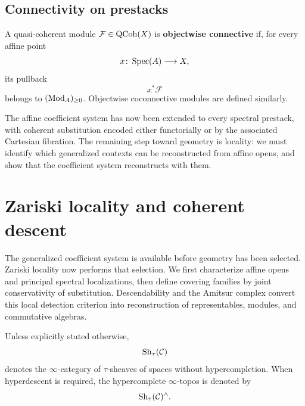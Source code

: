 \subsection{Connectivity on prestacks}

\begin{definition}
\label{def:objectwise-connective-qcoh}
A quasi-coherent module $\mathcal F\in\operatorname{QCoh}(X)$ is
\textbf{objectwise connective} if, for every affine point
\[
    x
    \colon
    \operatorname{Spec}(A)
    \longrightarrow
    X,
\]
its pullback
\[
    x^*\mathcal F
\]
belongs to $(\operatorname{Mod}_{A})_{\geq0}$. Objectwise coconnective modules are defined
similarly.
\end{definition}

The affine coefficient system has now been extended to every spectral
prestack, with coherent substitution encoded either functorially or by the
associated Cartesian fibration. The remaining step toward geometry is
locality: we must identify which generalized contexts can be reconstructed
from affine opens, and show that the coefficient system reconstructs with
them.

\section{Zariski locality and coherent descent}
\label{sec:affine-opens-zariski-descent}

The generalized coefficient system is available before geometry has been
selected. Zariski locality now performs that selection. We first characterize
affine opens and principal spectral localizations, then define covering
families by joint conservativity of substitution. Descendability and the
Amitsur complex convert this local detection criterion into reconstruction of
representables, modules, and commutative algebras.

\begin{convention}
\label{conv:spectral-sheaves-hyperdescent}
Unless explicitly stated otherwise,
\[
    \operatorname{Sh}_\tau(\mathcal C)
\]
denotes the $\infty$-category of $\tau$-sheaves of spaces without
hypercompletion. When hyperdescent is required, the hypercomplete
$\infty$-topos is denoted by
\[
    \operatorname{Sh}_\tau(\mathcal C)^\wedge.
\]
\end{convention}


